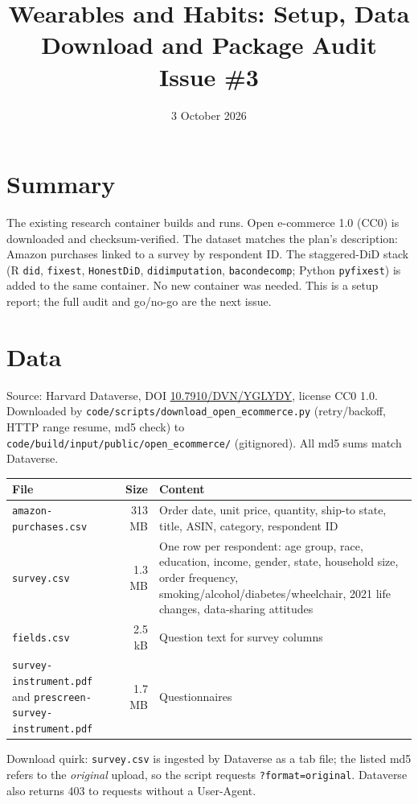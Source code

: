 \documentclass[11pt]{article}
\title{Wearables and Habits: Setup, Data Download and Package Audit\\\large Issue \#3}
\date{3 October 2026}
\author{}
\begin{document}
\maketitle

\section{Summary}
The existing research container builds and runs. Open e-commerce 1.0 (CC0) is downloaded and checksum-verified. The
dataset matches the plan's description: Amazon purchases linked to a survey by respondent ID. The staggered-DiD stack
(R \texttt{did}, \texttt{fixest}, \texttt{HonestDiD}, \texttt{didimputation}, \texttt{bacondecomp}; Python \texttt{pyfixest})
is added to the same container. No new container was needed. This is a setup report; the full audit and go/no-go are the next issue.

\section{Data}
Source: Harvard Dataverse, DOI \href{https://doi.org/10.7910/DVN/YGLYDY}{10.7910/DVN/YGLYDY}, license CC0 1.0.
Downloaded by \texttt{code/scripts/download\_open\_ecommerce.py} (retry/backoff, HTTP range resume, md5 check) to
\texttt{code/build/input/public/open\_ecommerce/} (gitignored). All md5 sums match Dataverse.

\begin{center}\small
\begin{tabular}{p{5.4cm}rp{6.2cm}}
\toprule
File & Size & Content \\\midrule
\texttt{amazon-purchases.csv} & 313 MB & Order date, unit price, quantity, ship-to state, title, ASIN, category, respondent ID \\
\texttt{survey.csv} & 1.3 MB & One row per respondent: age group, race, education, income, gender, state, household size, order frequency, smoking/alcohol/diabetes/wheelchair, 2021 life changes, data-sharing attitudes \\
\texttt{fields.csv} & 2.5 kB & Question text for survey columns \\
\texttt{survey-instrument.pdf} and \texttt{prescreen-} \texttt{survey-instrument.pdf} & 1.7 MB & Questionnaires \\
\bottomrule
\end{tabular}
\end{center}

\noindent Download quirk: \texttt{survey.csv} is ingested by Dataverse as a tab file; the listed md5 refers to the
\emph{original} upload, so the script requests \texttt{?format=original}. Dataverse also returns 403 to requests without a User-Agent.
\end{document}
